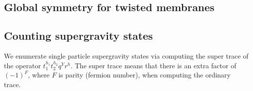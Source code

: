 
\subsection{Global symmetry for twisted membranes}

\subsection{Counting supergravity states}

We enumerate single particle supergravity states via computing the super trace of the operator $t_1^{h_1} t_2^{h_2} q^Y r^h$. 
The super trace means that there is an extra factor of $(-1)^F$, where $F$ is parity (fermion number), when computing the ordinary trace.

\parsec[s:pexp]


%
%

